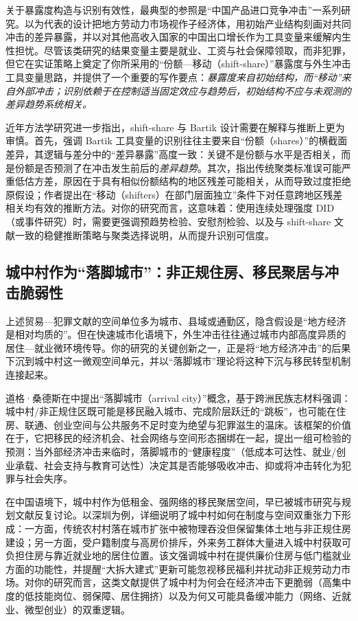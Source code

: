 关于暴露度构造与识别有效性，最典型的参照是“中国产品进口竞争冲击”一系列研究。以\citet{autor2013china}为代表的设计把地方劳动力市场视作子经济体，用初始产业结构刻画对共同冲击的差异暴露，并以对其他高收入国家的中国出口增长作为工具变量来缓解内生性担忧。尽管该类研究的结果变量主要是就业、工资与社会保障领取，而非犯罪，但它在实证策略上奠定了你所采用的“份额—移动（shift-share）”暴露度与外生冲击工具变量思路，并提供了一个重要的写作要点：\emph{暴露度来自初始结构，而“移动”来自外部冲击；识别依赖于在控制适当固定效应与趋势后，初始结构不应与未观测的差异趋势系统相关。}

近年方法学研究进一步指出，shift-share 与 Bartik 设计需要在解释与推断上更为审慎。首先，\citet{goldsmithpinkham2020bartik}强调 Bartik 工具变量的识别往往主要来自“份额（shares）”的横截面差异，其逻辑与差分中的“差异暴露”高度一致：关键不是份额与水平是否相关，而是份额是否预测了在冲击发生前后的\emph{差异趋势}。其次，\citet{adao2019shiftshare}指出传统聚类标准误可能严重低估方差，原因在于具有相似份额结构的地区残差可能相关，从而导致过度拒绝原假设；作者提出在“移动（shifters）在部门层面独立”条件下对任意跨地区残差相关均有效的推断方法。对你的研究而言，这意味着：使用连续处理强度 DID（或事件研究）时，需要更强调预趋势检验、安慰剂检验、以及与 shift-share 文献一致的稳健推断策略与聚类选择说明，从而提升识别可信度。

\subsection{城中村作为“落脚城市”：非正规住房、移民聚居与冲击脆弱性}
\label{subsec:arrival_city_cn}

上述贸易—犯罪文献的空间单位多为城市、县域或通勤区，隐含假设是“地方经济是相对均质的”。但在快速城市化语境下，外生冲击往往通过城市内部高度异质的居住—就业微环境传导。你的研究的关键创新之一，正是将“地方经济冲击”的后果下沉到城中村这一微观空间单元，并以“落脚城市”理论将这种下沉与移民转型机制连接起来。

道格·桑德斯在\citet{saunders2010arrival}中提出“落脚城市（arrival city）”概念，基于跨洲民族志材料强调：城中村/非正规住区既可能是移民融入城市、完成阶层跃迁的“跳板”，也可能在住房、联通、创业空间与公共服务不足时变为绝望与犯罪滋生的温床。该框架的价值在于，它把移民的经济机会、社会网络与空间形态捆绑在一起，提出一组可检验的预测：当外部经济冲击来临时，落脚城市的“健康程度”（低成本可达性、就业/创业承载、社会支持与教育可达性）决定其是否能够吸收冲击、抑或将冲击转化为犯罪与社会失序。

在中国语境下，城中村作为低租金、强网络的移民聚居空间，早已被城市研究与规划文献反复讨论。\citet{wang2009urbanization}以深圳为例，详细说明了城中村如何在制度与空间双重张力下形成：一方面，传统农村村落在城市扩张中被物理吞没但保留集体土地与非正规住房建设；另一方面，受户籍制度与高房价排斥，外来务工群体大量进入城中村获取可负担住房与靠近就业地的居住位置。该文强调城中村在提供廉价住房与低门槛就业方面的功能性，并提醒“大拆大建式”更新可能忽视移民福利并扰动非正规劳动力市场。对你的研究而言，这类文献提供了城中村为何会在经济冲击下更脆弱（高集中度的低技能岗位、弱保障、居住拥挤）以及为何又可能具备缓冲能力（网络、近就业、微型创业）的双重逻辑。

